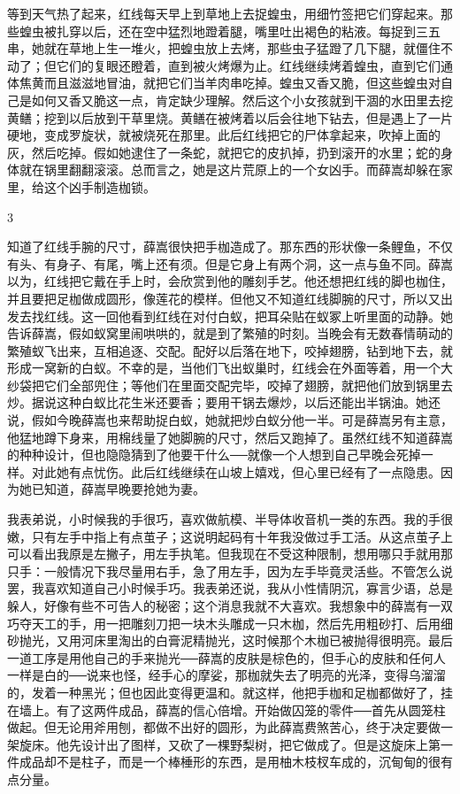 等到天气热了起来，红线每天早上到草地上去捉蝗虫，用细竹签把它们穿起来。那些蝗虫被扎穿以后，还在空中猛烈地蹬着腿，嘴里吐出褐色的粘液。每捉到三五串，她就在草地上生一堆火，把蝗虫放上去烤，那些虫子猛蹬了几下腿，就僵住不动了；但它们的复眼还瞪着，直到被火烤爆为止。红线继续烤着蝗虫，直到它们通体焦黄而且滋滋地冒油，就把它们当羊肉串吃掉。蝗虫又香又脆，但这些蝗虫对自己是如何又香又脆这一点，肯定缺少理解。然后这个小女孩就到干涸的水田里去挖黄鳝；挖到以后放到干草里烧。黄鳝在被烤着以后会往地下钻去，但是遇上了一片硬地，变成罗旋状，就被烧死在那里。此后红线把它的尸体拿起来，吹掉上面的灰，然后吃掉。假如她逮住了一条蛇，就把它的皮扒掉，扔到滚开的水里；蛇的身体就在锅里翻翻滚滚。总而言之，她是这片荒原上的一个女凶手。而薛嵩却躲在家里，给这个凶手制造枷锁。 

3 

知道了红线手腕的尺寸，薛嵩很快把手枷造成了。那东西的形状像一条鲤鱼，不仅有头、有身子、有尾，嘴上还有须。但是它身上有两个洞，这一点与鱼不同。薛嵩以为，红线把它戴在手上时，会欣赏到他的雕刻手艺。他还想把红线的脚也枷住，并且要把足枷做成圆形，像莲花的模样。但他又不知道红线脚腕的尺寸，所以又出发去找红线。这一回他看到红线在对付白蚁，把耳朵贴在蚁冢上听里面的动静。她告诉薛嵩，假如蚁窝里闹哄哄的，就是到了繁殖的时刻。当晚会有无数春情萌动的繁殖蚁飞出来，互相追逐、交配。配好以后落在地下，咬掉翅膀，钻到地下去，就形成一窝新的白蚁。不幸的是，当他们飞出蚁巢时，红线会在外面等着，用一个大纱袋把它们全部兜住；等他们在里面交配完毕，咬掉了翅膀，就把他们放到锅里去炒。据说这种白蚁比花生米还要香；要用干锅去爆炒，以后还能出半锅油。她还说，假如今晚薛嵩也来帮助捉白蚁，她就把炒白蚁分他一半。可是薛嵩另有主意，他猛地蹲下身来，用棉线量了她脚腕的尺寸，然后又跑掉了。虽然红线不知道薛嵩的种种设计，但也隐隐猜到了他要干什么──就像一个人想到自己早晚会死掉一样。对此她有点忧伤。此后红线继续在山坡上嬉戏，但心里已经有了一点隐患。因为她已知道，薛嵩早晚要抢她为妻。 

我表弟说，小时候我的手很巧，喜欢做航模、半导体收音机一类的东西。我的手很嫩，只有左手中指上有点茧子；这说明起码有十年我没做过手工活。从这点茧子上可以看出我原是左撇子，用左手执笔。但我现在不受这种限制，想用哪只手就用那只手：一般情况下我尽量用右手，急了用左手，因为左手毕竟灵活些。不管怎么说罢，我喜欢知道自己小时候手巧。我表弟还说，我从小性情阴沉，寡言少语，总是躲人，好像有些不可告人的秘密；这个消息我就不大喜欢。我想象中的薛嵩有一双巧夺天工的手，用一把雕刻刀把一块木头雕成一只木枷，然后先用粗砂打、后用细砂抛光，又用河床里淘出的白膏泥精抛光，这时候那个木枷已被抛得很明亮。最后一道工序是用他自己的手来抛光──薛嵩的皮肤是棕色的，但手心的皮肤和任何人一样是白的──说来也怪，经手心的摩娑，那枷就失去了明亮的光泽，变得乌溜溜的，发着一种黑光；但也因此变得更温和。就这样，他把手枷和足枷都做好了，挂在墙上。有了这两件成品，薛嵩的信心倍增。开始做囚笼的零件──首先从圆笼柱做起。但无论用斧用刨，都做不出好的圆形，为此薛嵩费煞苦心，终于决定要做一架旋床。他先设计出了图样，又砍了一棵野梨树，把它做成了。但是这旋床上第一件成品却不是柱子，而是一个棒棰形的东西，是用柚木枝杈车成的，沉甸甸的很有点分量。 

